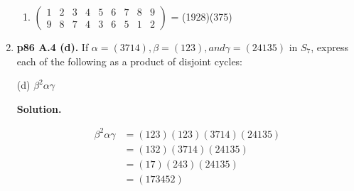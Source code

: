 \documentclass[11pt]{article}
\begin{document}
\begin{enumerate}
\begin{enumerate}
		\item 
		$\begin{pmatrix}
			1 & 2 & 3 & 4 & 5 & 6 & 7 & 8 & 9 \\
			9 & 8 & 7 & 4 & 3 & 6 & 5 & 1 & 2
		\end{pmatrix}$
		= (1928)(375)
  
  \end{enumerate}

\item {\bfseries p86 A.4 (d).} If $\alpha = (3714), \beta = (123), and \gamma = (24135)$ in $S_7$, express each of the following as a product of disjoint cycles:

	(d) $\beta^2\alpha\gamma$
  
	{\bfseries Solution.}
  	
  	\begin{align*}
		\beta^2 \alpha \gamma &= (123)(123)(3714)(24135) \\
		&= (132)(3714)(24135) \\
		&= (17)(243)(24135) \\
		&= (173452) \\
	\end{align*}
	
\newpage

\end{enumerate}
\end{document}

